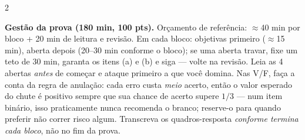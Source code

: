 \documentclass[10pt,a4paper]{article}
\begin{document}
\begin{multicols}{2}
\vspace{0.4em}
\noindent\colorbox{cinzasol}{\parbox{\dimexpr\linewidth-2\fboxsep}{\footnotesize
\textbf{Gestão da prova (180 min, 100 pts).} Orçamento de referência: $\approx$40 min por bloco + 20 min de leitura e revisão. Em cada bloco: objetivas primeiro ($\approx$15 min), aberta depois (20--30 min conforme o bloco); se uma aberta travar, fixe um teto de 30 min, garanta os itens (a) e (b) e siga --- volte na revisão. Leia as 4 abertas \emph{antes} de começar e ataque primeiro a que você domina. Nas V/F, faça a conta da regra de anulação: cada erro custa \emph{meio} acerto, então o valor esperado do chute é positivo sempre que sua chance de acerto supere $1/3$ --- num item binário, isso praticamente nunca recomenda o branco; reserve-o para quando preferir não correr risco algum. Transcreva os quadros-resposta \emph{conforme termina cada bloco}, não no fim da prova.}}

\vspace{0.5em}

\end{multicols}
\end{document}

